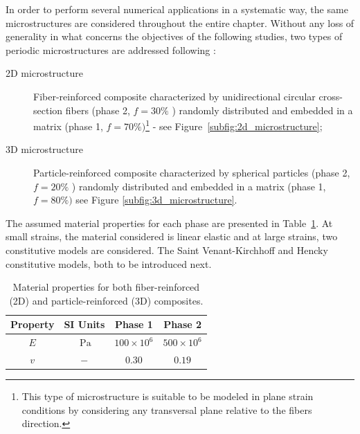 In order to perform several numerical applications in a systematic way, the same microstructures are considered throughout the entire chapter.
Without any loss of generality in what concerns the objectives of the following studies, two types of periodic microstructures are addressed following \cite{ferreira_accurate_2020}:

\begin{description}
  \item[2D microstructure] Fiber-reinforced composite characterized by unidirectional circular cross-section fibers (phase 2, \(f=30 \%\) ) randomly distributed and embedded in a matrix (phase 1, \(f=70 \%)\)\footnote{This type of microstructure is suitable to be modeled in plane strain conditions by considering any transversal plane
relative to the fibers direction.} - see Figure~\ref{subfig:2d_microstructure};

  \item[3D microstructure] Particle-reinforced composite characterized by spherical particles (phase 2, \(f=20 \%\) ) randomly distributed and embedded in a matrix (phase 1, \(f=80 \%)\) see Figure \ref{subfig:3d_microstructure}.
\end{description}

The assumed material properties for each phase are presented in Table~\ref{tab:mat_properties}.
At small strains, the material considered is linear elastic and at large strains, two constitutive models are considered.
The Saint Venant-Kirchhoff and Hencky constitutive models, both to be introduced next.

\begin{table}[htbp]
  \caption{Material properties for both fiber-reinforced (2D) and particle-reinforced (3D) composites.}
\label{tab:mat_properties}
  \centering
  \begin{tabular}{cccc}
  \vphantom{\Big |}Property & SI Units & Phase 1 & Phase 2 \\
  \hline\hline \vphantom{\Big |}\(E\) & \(\mathrm{~Pa}\) & \(100 \times 10^{6}\) & \(500 \times 10^{6}\) \\
  \(v\) & \(-\) & \(0.30\) & \(0.19\) \\
  \hline\hline
  \end{tabular}
\end{table}

